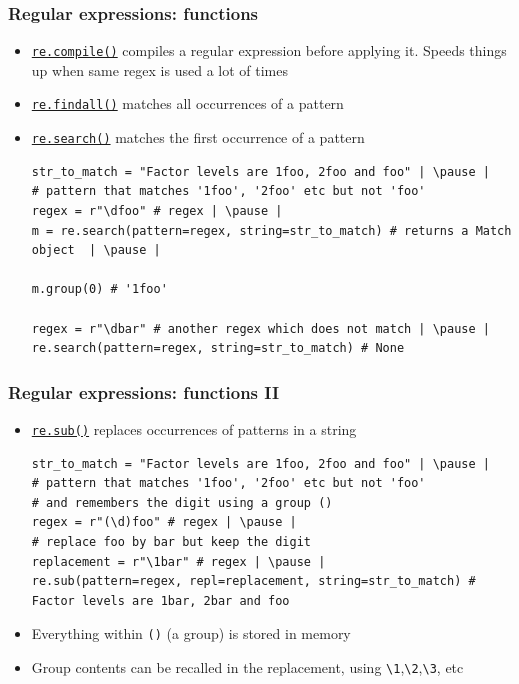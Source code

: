 \documentclass[xcolor=table]{beamer}
\begin{document}
\begin{frame}[fragile]
\frametitle{Regular expressions: functions}
    \begin{itemize}
        \item \href{https://docs.python.org/3.7/library/re.html#re.compile}{\texttt{re.compile()}} compiles a regular expression before applying it. Speeds things up when same regex is used a lot of times \pause
        \item \href{https://docs.python.org/3.7/library/re.html#re.findall}{\texttt{re.findall()}} matches all occurrences of a pattern \pause
        \item \href{https://docs.python.org/3.7/library/re.html#re.search}{\texttt{re.search()}} matches the first occurrence of a pattern
\begin{lstlisting}[style=python,belowskip=-1 \baselineskip]
str_to_match = "Factor levels are 1foo, 2foo and foo" | \pause |
# pattern that matches '1foo', '2foo' etc but not 'foo'
regex = r"\dfoo" # regex | \pause |  
m = re.search(pattern=regex, string=str_to_match) # returns a Match object  | \pause |

m.group(0) # '1foo'

regex = r"\dbar" # another regex which does not match | \pause |  
re.search(pattern=regex, string=str_to_match) # None
\end{lstlisting}
    \end{itemize}
\end{frame}

\begin{frame}[fragile]
\frametitle{Regular expressions: functions II}
    \begin{itemize}
        \item \href{https://docs.python.org/3.7/library/re.html#re.sub}{\texttt{re.sub()}} replaces occurrences of patterns in a string \pause
\begin{lstlisting}[style=python,belowskip=-1.5 \baselineskip]
str_to_match = "Factor levels are 1foo, 2foo and foo" | \pause |
# pattern that matches '1foo', '2foo' etc but not 'foo'
# and remembers the digit using a group () 
regex = r"(\d)foo" # regex | \pause |  
# replace foo by bar but keep the digit
replacement = r"\1bar" # regex | \pause |  
re.sub(pattern=regex, repl=replacement, string=str_to_match) # Factor levels are 1bar, 2bar and foo
\end{lstlisting} \pause
        \item Everything within \texttt{()} (a group) is stored in memory \pause
        \item Group contents can be recalled in the replacement, using \texttt{\textbackslash 1},\texttt{\textbackslash 2},\texttt{\textbackslash 3}, etc
    \end{itemize}
\end{frame}
\end{document}
